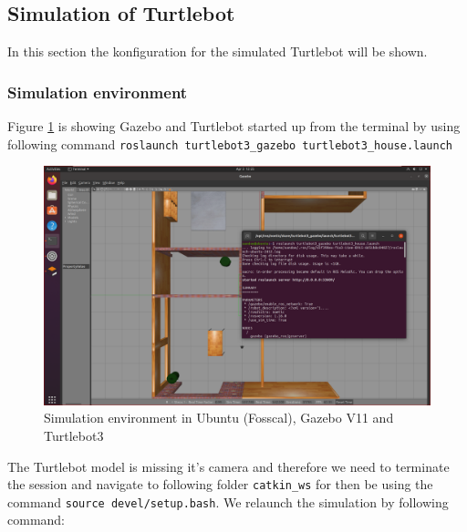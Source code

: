 \documentclass[12pt,a4paper]{article}
\begin{document}
	\subsection{Simulation of Turtlebot}
	In this section the konfiguration for the simulated Turtlebot will be shown.
	\subsubsection{Simulation environment}
	Figure \ref{fig:fig1} is showing Gazebo and Turtlebot started up from the terminal by using following command \texttt{roslaunch turtlebot3\_gazebo turtlebot3\_house.launch}
	\begin{figure}[!h]
		\centering
		\includegraphics[width=\linewidth]{fig1.png}
		\caption{Simulation environment in Ubuntu (Fosscal), Gazebo V11 and Turtlebot3}
		\label{fig:fig1}
	\end{figure}
	The Turtlebot model is missing it's camera and therefore we need to terminate the session and navigate to following folder \texttt{catkin\_ws} for then be using the command \texttt{source devel/setup.bash}. We relaunch the simulation by following command:
	
\end{document}
